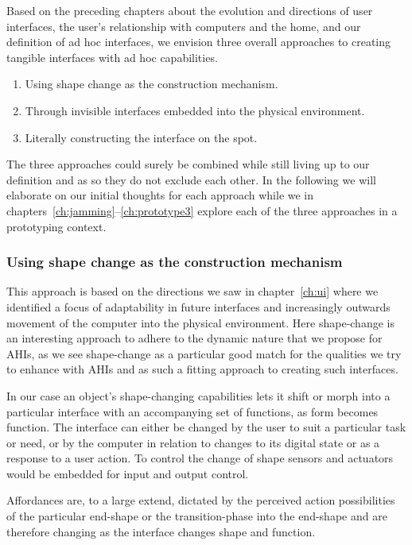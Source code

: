 Based on the preceding chapters about the evolution and directions of user interfaces, the user's relationship with computers and the home, and our definition of ad hoc interfaces, we envision three overall approaches to creating tangible interfaces with ad hoc capabilities.

\begin{enumerate}
	\item{Using shape change as the construction mechanism.}
	\item{Through invisible interfaces embedded into the physical environment.}
	\item{Literally constructing the interface on the spot.}
\end{enumerate}
The three approaches could surely be combined while still living up to our definition and as so they do not exclude each other.
In the following we will elaborate on our initial thoughts for each approach while we in chapters~\ref{ch:jamming}--\ref{ch:prototype3} explore each of the three approaches in a prototyping context.

\subsubsection{Using shape change as the construction mechanism}
This approach is based on the directions we saw in chapter~\ref{ch:ui} where we identified a focus of adaptability in future interfaces and increasingly outwards movement of the computer into the physical environment.
Here shape-change is an interesting approach to adhere to the dynamic nature that we propose for AHIs, as we see shape-change as a particular good match for the qualities we try to enhance with AHIs and as such a fitting approach to creating such interfaces.

In our case an object's shape-changing capabilities lets it shift or morph into a particular interface with an accompanying set of functions, as form becomes function.
The interface can either be changed by the user to suit a particular task or need, or by the computer in relation to changes to its digital state or as a response to a user action.
To control the change of shape sensors and actuators would be embedded for input and output control.

Affordances are, to a large extend, dictated by the perceived action possibilities of the particular end-shape or the transition-phase into the end-shape and are therefore changing as the interface changes shape and function.

